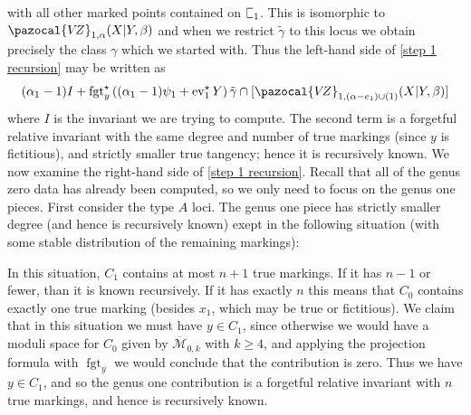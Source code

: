 \documentclass[11pt]{amsart}
\newcommand{\sqC}{\scalebox{0.8}[1.3]{$\sqsubset$}}
\newcommand{\VZ}{\pazocal{V\!Z}}
\newcommand{\st}{\star}
\newcommand{\ev}{\operatorname{ev}}
\newcommand{\fgt}{\operatorname{fgt}}
\newcommand{\Mcal}{\mathcal{M}}
\newcommand{\ol}[1]{\overline{#1}}
\theoremstyle{definition}
\theoremstyle{definition}
\begin{document}
with all other marked points contained on $\sqC_1$. This is isomorphic to $\VZ_{1,\alpha}(X|Y,\beta)$ and when we restrict $\tilde\gamma$ to this locus we obtain precisely the class $\gamma$ which we started with. Thus the left-hand side of \eqref{step 1 recursion} may be written as
\begin{equation*} (\alpha_1-1) I + \fgt_y^\st \left( (\alpha_1-1)\psi_1 + \ev_1^\st Y\right)  \tilde\gamma \cap [\VZ_{1,(\alpha-e_1)\cup(1)}(X|Y,\beta)]\end{equation*}
where $I$ is the invariant we are trying to compute. The second term is a forgetful relative invariant with the same degree and number of true markings (since $y$ is fictitious), and strictly smaller true tangency; hence it is recursively known. We now examine the right-hand side of \eqref{step 1 recursion}. Recall that all of the genus zero data has already been computed, so we only need to focus on the genus one pieces. First consider the type $A$ loci. The genus one piece has strictly smaller degree (and hence is recursively known) exept in the following situation (with some stable distribution of the remaining markings):
\begin{center}
\end{center}
In this situation, $C_1$ contains at most $n+1$ true markings. If it has $n-1$ or fewer, than it is known recursively. If it has exactly $n$ this means that $C_0$ contains exactly one true marking (besides $x_1$, which may be true or fictitious). We claim that in this situation we must have $y \in C_1$, since otherwise we would have a moduli space for $C_0$ given by $\ol\Mcal_{0,k}$ with $k \geq 4$, and  applying the projection formula with $\fgt_y$ we would conclude that the contribution is zero. Thus we have $y \in C_1$, and so the genus one contribution is a forgetful relative invariant with $n$ true markings, and hence is recursively known.
\end{document}
